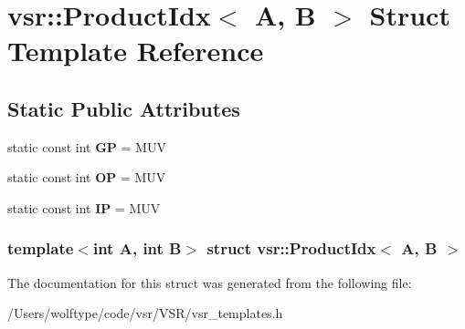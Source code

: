 \hypertarget{structvsr_1_1_product_idx}{\section{vsr\-:\-:Product\-Idx$<$ A, B $>$ Struct Template Reference}
\label{structvsr_1_1_product_idx}
}
\subsection*{Static Public Attributes}
\begin{DoxyCompactItemize}
\item 
\hypertarget{structvsr_1_1_product_idx_ae93fd109a9f4144031f521a9ab941087}{static const int {\bfseries G\-P} = M\-U\-V}\label{structvsr_1_1_product_idx_ae93fd109a9f4144031f521a9ab941087}

\item 
\hypertarget{structvsr_1_1_product_idx_a6e38c8f5c2b75fee2489a39858885c24}{static const int {\bfseries O\-P} = M\-U\-V}\label{structvsr_1_1_product_idx_a6e38c8f5c2b75fee2489a39858885c24}

\item 
\hypertarget{structvsr_1_1_product_idx_a6fc413e84b2a9aefdbdf01e125fcf2e5}{static const int {\bfseries I\-P} = M\-U\-V}\label{structvsr_1_1_product_idx_a6fc413e84b2a9aefdbdf01e125fcf2e5}

\end{DoxyCompactItemize}
\subsubsection*{template$<$int A, int B$>$ struct vsr\-::\-Product\-Idx$<$ A, B $>$}



The documentation for this struct was generated from the following file\-:\begin{DoxyCompactItemize}
\item 
/\-Users/wolftype/code/vsr/\-V\-S\-R/vsr\-\_\-templates.\-h\end{DoxyCompactItemize}
